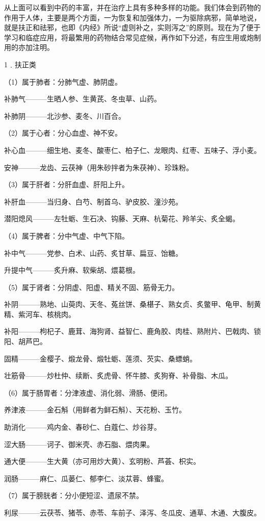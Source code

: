 \documentclass[12pt,UTF8]{ctexbook}
\begin{document}
从上面可以看到中药的丰富，并在治疗上具有多种多样的功能。我们体会到药物的作用于人体，主要是两个方面，一为恢复和加强体力，一为驱除病邪，简单地说，就是扶正和祛邪，也即《内经》所说“虚则补之，实则泻之”的原则。现在为了便于学习和临症应用，将最繁用的药物结合常见症候，再作如下分述，有应生用或炮制用的亦加注明。

1﹒扶正类

（1）属于肺者：分肺气虚、肺阴虚。

补肺气———生晒人参、生黄芪、冬虫草、山药。

补肺阴———北沙参、麦冬、川百合。

（2）属于心者：分心血虚、神不安。

补心血———细生地、麦冬、酸枣仁、柏子仁、龙眼肉、红枣、五味子、浮小麦。

安神———龙齿、云茯神（用朱砂拌者为朱茯神）、珍珠粉。

（3）属于肝者：分肝血虚、肝阳上升。

补肝血———当归身、白芍、制首乌、驴皮胶、潼沙苑。

潜阳熄风———左牡蛎、生石决、钩藤、天麻、杭菊花、羚羊尖、炙全蝎。

（4）属于脾者：分中气虚、中气下陷。

补中气———党参、白术、山药、炙甘草、扁豆、饴糖。

升提中气———炙升麻、软柴胡、煨葛根。

（5）属于肾者：分阴虚、阳虚、精关不固、筋骨无力。

补阴———熟地、山萸肉、天冬、菟丝饼、桑椹子、熟女贞、炙鳖甲、龟甲、制黄精、紫河车、核桃肉。

补阳———枸杞子、鹿茸、海狗肾、益智仁、鹿角胶、肉桂、熟附片、巴戟肉、锁阳、胡芦巴。

固精———金樱子、煅龙骨、煅牡蛎、莲须、芡实、桑螵蛸。

壮筋骨———炒杜仲、续断、炙虎骨、怀牛膝、炙狗脊、补骨脂、木瓜。

（6）属于肠胃者：分津液虚、消化弱、滑肠、便闭。

养津液———金石斛（用鲜者为鲜石斛）、天花粉、玉竹。

助消化———鸡内金、春砂仁、白蔻仁、炒谷芽。

涩大肠———诃子、御米壳、赤石脂、煨肉果。

通大便———生大黄（亦可用炒大黄）、玄明粉、芦荟、枳实。

润肠———麻仁、瓜蒌仁、郁李仁、淡苁蓉、蜂蜜。

（7）属于膀胱者：分小便短涩、遗尿不禁。

利尿———云茯苓、猪苓、赤苓、车前子、泽泻、冬瓜皮、通草、木通、大腹皮。
\end{document}
